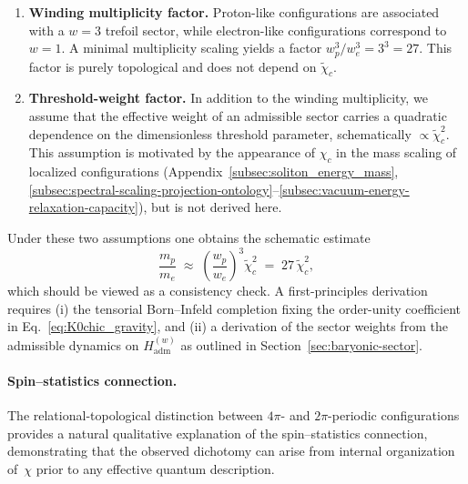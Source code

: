     \begin{enumerate}

      \item \textbf{Winding multiplicity factor.}
      Proton-like configurations are associated with a $w=3$ trefoil sector, while
      electron-like configurations correspond to $w=1$.
      A minimal multiplicity scaling yields a factor $w_p^3/w_e^3 = 3^3 = 27$.
      This factor is purely topological and does not depend on $\tilde{\chi}_c$.

      \item \textbf{Threshold-weight factor.}
      In addition to the winding multiplicity, we assume that the effective weight of an
      admissible sector carries a quadratic dependence on the dimensionless threshold
      parameter, schematically $\propto \tilde{\chi}_c^2$.
      This assumption is motivated by the appearance of $\chi_c$ in the mass scaling of
      localized configurations (Appendix~\ref{subsec:soliton_energy_mass},
      \ref{subsec:spectral-scaling-projection-ontology}--\ref{subsec:vacuum-energy-relaxation-capacity}), but is not
      derived here.

    \end{enumerate}

    \noindent
    Under these two assumptions one obtains the schematic estimate
    \begin{equation}
      \frac{m_p}{m_e}
      \;\approx\;
      \left(\frac{w_p}{w_e}\right)^3 \tilde{\chi}_c^2
      \;=\; 27\,\tilde{\chi}_c^2,
      \label{eq:massratio_topo}
    \end{equation}
    which should be viewed as a consistency check.
    A first-principles derivation requires (i) the tensorial Born--Infeld completion
    fixing the order-unity coefficient in Eq.~\eqref{eq:K0chic_gravity}, and (ii) a
    derivation of the sector weights from the admissible dynamics on
    $H^{(w)}_{\mathrm{adm}}$ as outlined in Section~\ref{sec:baryonic-sector}.

  \paragraph{Spin--statistics connection.}
    The relational-topological distinction between $4\pi$- and
    $2\pi$-periodic configurations provides a natural qualitative
    explanation of the spin--statistics connection, demonstrating that the
    observed dichotomy can arise from internal organization of~$\chi$ prior
    to any effective quantum description.
